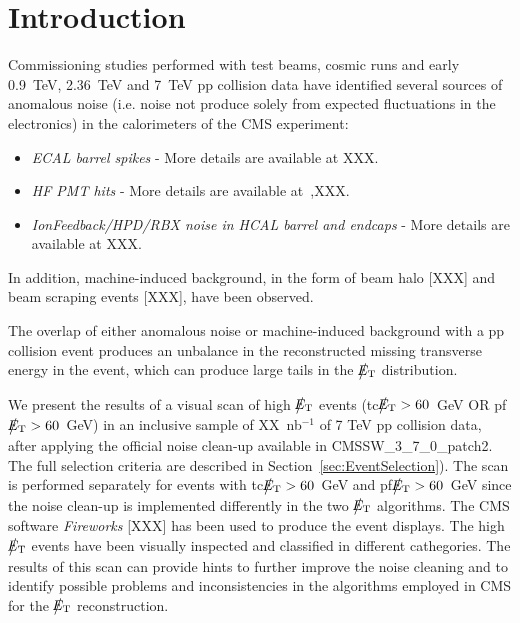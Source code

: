 \section{Introduction}

Commissioning studies performed with test beams, cosmic runs and 
early 0.9~TeV, 2.36~TeV and 7~TeV pp 
collision data have identified several sources of anomalous noise 
(i.e. noise not produce solely from expected fluctuations in the electronics)
in the calorimeters of the CMS experiment:
\begin{itemize}
\item {\it ECAL barrel spikes} - More details are available at XXX.

\item {\it HF PMT hits} - More details are available at~\cite{Chatrchyan:1225105},XXX.

\item {\it IonFeedback/HPD/RBX noise in HCAL barrel and endcaps} - More details are available at XXX.
\end{itemize}
In addition, machine-induced background, in the form of 
beam halo [XXX] and beam scraping events [XXX], have been observed. 

The overlap of either anomalous noise or machine-induced background 
with a pp collision event produces an unbalance in 
the reconstructed missing transverse energy in the event, which can produce 
large tails in the $\big\slash\hspace{-1.6ex}{E_\text{T}}$ distribution. 

We present the results of a visual scan of high $\big\slash\hspace{-1.6ex}{E_\text{T}}$ events 
(tc$\big\slash\hspace{-1.6ex}{E_\text{T}}>60$~GeV OR pf$\big\slash\hspace{-1.6ex}{E_\text{T}}>60$~GeV)
in an inclusive sample of XX~nb$^{-1}$ of 7 TeV pp collision data, 
after applying the official noise clean-up available in CMSSW\_3\_7\_0\_patch2.
The full selection criteria are described in Section~\ref{sec:EventSelection}). 
The scan is performed separately for events with tc$\big\slash\hspace{-1.6ex}{E_\text{T}}>60$~GeV and pf$\big\slash\hspace{-1.6ex}{E_\text{T}}>60$~GeV
since the noise clean-up is implemented differently in the two $\big\slash\hspace{-1.6ex}{E_\text{T}}$ algorithms.
The CMS software {\it Fireworks} [XXX] has been used to produce the event displays. 
The high $\big\slash\hspace{-1.6ex}{E_\text{T}}$ events have been visually inspected and classified in different 
cathegories. The results of this scan can provide hints to further improve the noise 
cleaning and to identify possible problems and inconsistencies in the algorithms employed 
in CMS for the $\big\slash\hspace{-1.6ex}{E_\text{T}}$ reconstruction.

